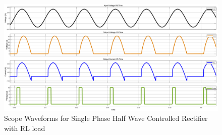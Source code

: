 \begin{figure}[h]
    \centering
    \includegraphics[width=1\textwidth]{images/experiment-1/circuit-scope-experiment-06.png}
    \caption{Scope Waveforms for Single Phase Half Wave Controlled Rectifier with RL load}
    \label{Fig_waveform_single-phase-half-wave-controlled-rectifier-with-RL-load}
\end{figure}

\pagebreak
